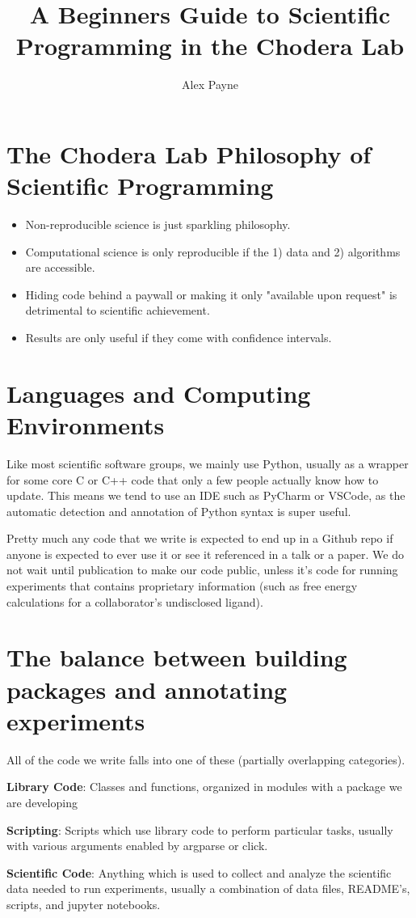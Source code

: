 \documentclass[12pt, english, course]{lecture}
\title{A Beginners Guide to Scientific Programming in the Chodera Lab}
\author{Alex Payne}
\begin{document}
\section{The Chodera Lab Philosophy of Scientific Programming}
\begin{itemize}
    \item Non-reproducible science is just sparkling philosophy.
    \item Computational science is only reproducible if the 1) data and 2) algorithms are accessible.
    \item Hiding code behind a paywall or making it only "available upon request" is detrimental to scientific achievement.
    \item Results are only useful if they come with confidence intervals.
\end{itemize}

\section{Languages and Computing Environments}
Like most scientific software groups, we mainly use Python, usually as a wrapper for some core C or C++ code that only a few people actually know how to update.
This means we tend to use an IDE such as PyCharm or VSCode, as the automatic detection and annotation of Python syntax is super useful.

Pretty much any code that we write is expected to end up in a Github repo if anyone is expected to ever use it or see it referenced in a talk or a paper.
We do not wait until publication to make our code public, unless it's code for running experiments that contains proprietary information (such as free energy calculations for a collaborator's undisclosed ligand).

\section{The balance between building packages and annotating experiments}
All of the code we write falls into one of these (partially overlapping categories).

\textbf{Library Code}: Classes and functions, organized in modules with a package we are developing

\textbf{Scripting}: Scripts which use library code to perform particular tasks, usually with various arguments enabled by argparse or click.

\textbf{Scientific Code}: Anything which is used to collect and analyze the scientific data needed to run experiments, usually a combination of data files, README's, scripts, and jupyter notebooks.
\end{document}
